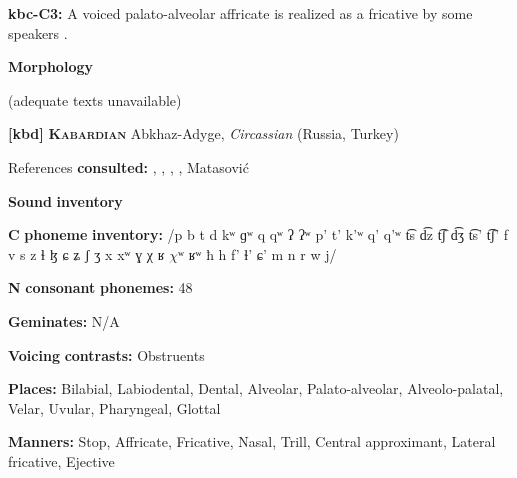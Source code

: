 \begin{styleBody}
\textbf{kbc-C3:} A voiced palato-alveolar affricate is realized as a fricative by some speakers \citep[15-16]{Sandalo1997}.
\end{styleBody}

\begin{styleBody}
\textbf{Morphology}
\end{styleBody}

\begin{styleBody}
(adequate texts unavailable)
\end{styleBody}

\begin{styleBody}
\textbf{[kbd]}   \textbf{\textsc{Kabardian}}  Abkhaz-Adyge, \textit{Circassian} (Russia, Turkey)
\end{styleBody}

\begin{styleBody}
References \textbf{consulted:} \citet{Applebaum2013}, \citet{Colarusso2006}, \citet{GordonApplebaum2010}, \citet{Kuipers1960}, Matasović 
\end{styleBody}

\begin{styleBody}
\textbf{Sound} \textbf{inventory}
\end{styleBody}

\begin{styleBody}
\textbf{C} \textbf{phoneme} \textbf{inventory:} /p b t d kʷ ɡʷ q qʷ ʔ ʔʷ p’ t’ k’ʷ q’ q’ʷ t͡s d͡z t͡ʃ d͡ʒ t͡s’ t͡ʃ’ f v s z ɬ ɮ ɕ ʑ ʃ ʒ x xʷ ɣ χ ʁ $\chi ʷ$ ʁʷ ħ h f' ɬ’ ɕ' m n r w j/
\end{styleBody}

\begin{styleBody}
\textbf{N} \textbf{consonant} \textbf{phonemes:} 48
\end{styleBody}

\begin{styleBody}
\textbf{Geminates:} N/A
\end{styleBody}

\begin{styleBody}
\textbf{Voicing} \textbf{contrasts:} Obstruents
\end{styleBody}

\begin{styleBody}
\textbf{Places:} Bilabial, Labiodental, Dental, Alveolar, Palato-alveolar, Alveolo-palatal, Velar, Uvular, Pharyngeal, Glottal
\end{styleBody}

\begin{styleBody}
\textbf{Manners:} Stop, Affricate, Fricative, Nasal, Trill, Central approximant, Lateral fricative, Ejective
\end{styleBody}


